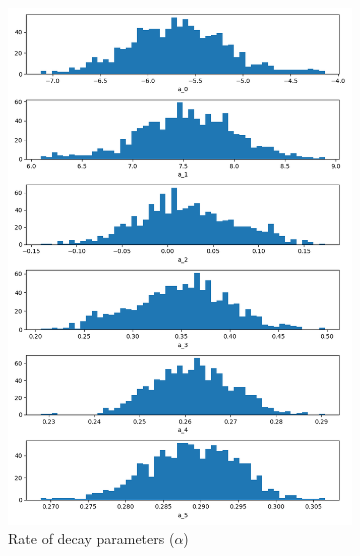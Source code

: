 \documentclass{article}
\begin{document}
    \begin{figure}[H]
        \centering
        \begin{subfigure}[b]{0.49\linewidth}
            \includegraphics[width=\linewidth]{figs/bayes_alpha_sampled_histogram.png}
            \caption{Rate of decay parameters ($\alpha$)}
        \end{subfigure}
        \begin{subfigure}[b]{0.49\linewidth}

\end{subfigure}
\end{figure}
\end{document}
